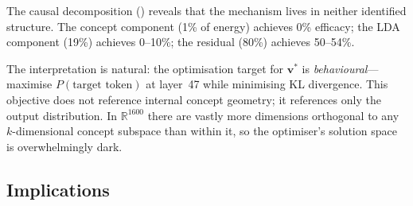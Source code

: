 \documentclass[11pt,a4paper]{article}
\newcommand{\vv}{\mathbf{v}}
\newcommand{\R}{\mathbb{R}}
\begin{document}
The causal decomposition () reveals that the mechanism lives in neither identified structure.
The concept component (1\% of energy) achieves 0\% efficacy; the LDA component (19\%) achieves 0--10\%; the residual (80\%) achieves 50--54\%.

The interpretation is natural: the optimisation target for $\vv^*$ is \emph{behavioural}---maximise $P(\text{target token})$ at layer~47 while minimising KL divergence.
This objective does not reference internal concept geometry; it references only the output distribution.
In $\R^{1600}$ there are vastly more dimensions orthogonal to any $k$-dimensional concept subspace than within it, so the optimiser's solution space is overwhelmingly dark.



\subsection{Implications}
\end{document}
